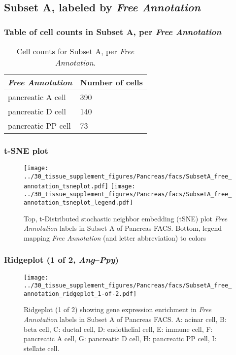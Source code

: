 \clearpage

\subsection{Subset A, labeled by \emph{Free Annotation}}
\subsubsection{Table of cell counts in Subset A, per \emph{Free Annotation}}\begin{table}[h]
\centering
\label{my-label}
\begin{tabular}{@{}ll@{}}
\toprule

\emph{Free Annotation}& Number of cells \\ \midrule
pancreatic A cell & 390 \\

pancreatic D cell & 140 \\

pancreatic PP cell & 73 \\
\bottomrule
\end{tabular}
\caption{Cell counts for Subset A, per \emph{Free Annotation}.}
\end{table}

\clearpage
\subsubsection{t-SNE plot}
\begin{figure}[h]
\centering
\texttt{[image: ../30\_tissue\_supplement\_figures/Pancreas/facs/SubsetA\_free\_annotation\_tsneplot.pdf]}
\texttt{[image: ../30\_tissue\_supplement\_figures/Pancreas/facs/SubsetA\_free\_annotation\_tsneplot\_legend.pdf]}
\caption{Top, t-Distributed stochastic neighbor embedding (tSNE) plot  \emph{Free Annotation} labels in Subset A of Pancreas FACS. Bottom, legend mapping \emph{Free Annotation} (and letter abbreviation) to colors}
\end{figure}


\clearpage

\subsubsection{Ridgeplot (1 of 2, \emph{Ang}--\emph{Ppy})}
\begin{figure}[h]
\centering
\texttt{[image: ../30\_tissue\_supplement\_figures/Pancreas/facs/SubsetA\_free\_annotation\_ridgeplot\_1-of-2.pdf]}

\caption{ Ridgeplot (1 of 2)  showing gene expression enrichment in \emph{Free Annotation} labels in Subset A of Pancreas FACS. A: acinar cell, B: beta cell, C: ductal cell, D: endothelial cell, E: immune cell, F: pancreatic A cell, G: pancreatic D cell, H: pancreatic PP cell, I: stellate cell.}
\end{figure}


